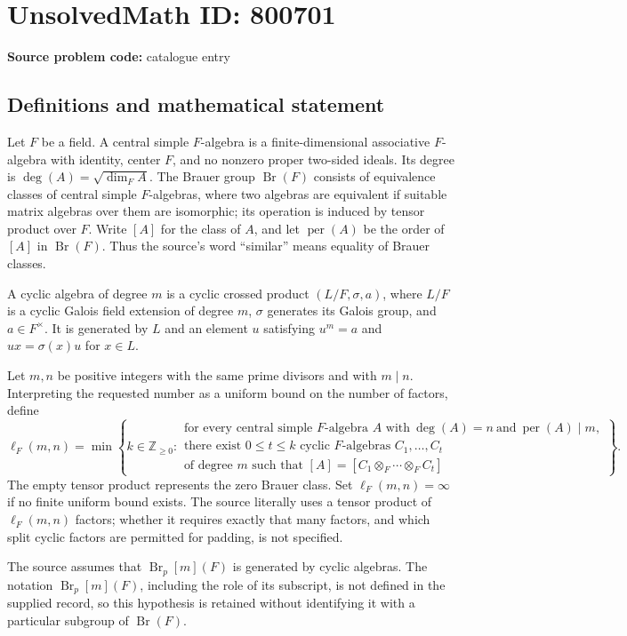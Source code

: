 \documentclass[11pt]{article}
\newcommand{\Z}{\mathbb{Z}}
\begin{document}
\section*{UnsolvedMath ID: 800701}
\textbf{Source problem code:} catalogue entry
\subsection{Definitions and mathematical statement}
Let \(F\) be a field. A central simple \(F\)-algebra is a finite-dimensional associative \(F\)-algebra with identity, center \(F\), and no nonzero proper two-sided ideals. Its degree is \(\deg(A)=\sqrt{\dim_F A}\). The Brauer group \(\operatorname{Br}(F)\) consists of equivalence classes of central simple \(F\)-algebras, where two algebras are equivalent if suitable matrix algebras over them are isomorphic; its operation is induced by tensor product over \(F\). Write \([A]\) for the class of \(A\), and let \(\operatorname{per}(A)\) be the order of \([A]\) in \(\operatorname{Br}(F)\). Thus the source's word ``similar'' means equality of Brauer classes.

A cyclic algebra of degree \(m\) is a cyclic crossed product \((L/F,\sigma,a)\), where \(L/F\) is a cyclic Galois field extension of degree \(m\), \(\sigma\) generates its Galois group, and \(a\in F^\times\). It is generated by \(L\) and an element \(u\) satisfying \(u^m=a\) and \(ux=\sigma(x)u\) for \(x\in L\).

Let \(m,n\) be positive integers with the same prime divisors and with \(m\mid n\). Interpreting the requested number as a uniform bound on the number of factors, define
\[
\ell_F(m,n)=\min\left\{k\in\Z_{\geq0}:\begin{array}{l}
\text{for every central simple }F\text{-algebra }A\text{ with}\ \deg(A)=n\ \text{and}\ \operatorname{per}(A)\mid m,\\
\text{there exist }0\leq t\leq k\text{ cyclic }F\text{-algebras }C_1,\ldots,C_t\\
\text{of degree }m\text{ such that }[A]=[C_1\otimes_F\cdots\otimes_F C_t]
\end{array}\right\}.
\]
The empty tensor product represents the zero Brauer class. Set \(\ell_F(m,n)=\infty\) if no finite uniform bound exists. The source literally uses a tensor product of \(\ell_F(m,n)\) factors; whether it requires exactly that many factors, and which split cyclic factors are permitted for padding, is not specified.

The source assumes that \(\operatorname{Br}_p[m](F)\) is generated by cyclic algebras. The notation \(\operatorname{Br}_p[m](F)\), including the role of its subscript, is not defined in the supplied record, so this hypothesis is retained without identifying it with a particular subgroup of \(\operatorname{Br}(F)\).
\end{document}
